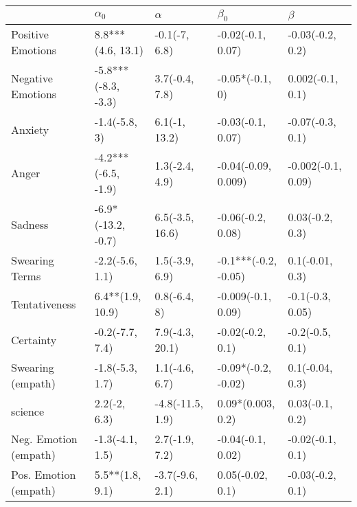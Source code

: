 \begin{tabular}{lllll}
\toprule
{} &           $\alpha_0$ &          $\alpha$ &             $\beta_0$ &             $\beta$ \\
\midrule
Positive Emotions     &    8.8***(4.6, 13.1) &     -0.1(-7, 6.8) &     -0.02(-0.1, 0.07) &    -0.03(-0.2, 0.2) \\
Negative Emotions     &  -5.8***(-8.3, -3.3) &    3.7(-0.4, 7.8) &       -0.05*(-0.1, 0) &    0.002(-0.1, 0.1) \\
Anxiety               &        -1.4(-5.8, 3) &     6.1(-1, 13.2) &     -0.03(-0.1, 0.07) &    -0.07(-0.3, 0.1) \\
Anger                 &  -4.2***(-6.5, -1.9) &    1.3(-2.4, 4.9) &   -0.04(-0.09, 0.009) &  -0.002(-0.1, 0.09) \\
Sadness               &   -6.9*(-13.2, -0.7) &   6.5(-3.5, 16.6) &     -0.06(-0.2, 0.08) &     0.03(-0.2, 0.3) \\
Swearing Terms        &      -2.2(-5.6, 1.1) &    1.5(-3.9, 6.9) &  -0.1***(-0.2, -0.05) &     0.1(-0.01, 0.3) \\
Tentativeness         &     6.4**(1.9, 10.9) &      0.8(-6.4, 8) &    -0.009(-0.1, 0.09) &    -0.1(-0.3, 0.05) \\
Certainty             &      -0.2(-7.7, 7.4) &   7.9(-4.3, 20.1) &      -0.02(-0.2, 0.1) &     -0.2(-0.5, 0.1) \\
Swearing (empath)     &      -1.8(-5.3, 1.7) &    1.1(-4.6, 6.7) &   -0.09*(-0.2, -0.02) &     0.1(-0.04, 0.3) \\
science               &         2.2(-2, 6.3) &  -4.8(-11.5, 1.9) &     0.09*(0.003, 0.2) &     0.03(-0.1, 0.2) \\
Neg. Emotion (empath) &      -1.3(-4.1, 1.5) &    2.7(-1.9, 7.2) &     -0.04(-0.1, 0.02) &    -0.02(-0.1, 0.1) \\
Pos. Emotion (empath) &      5.5**(1.8, 9.1) &   -3.7(-9.6, 2.1) &      0.05(-0.02, 0.1) &    -0.03(-0.2, 0.1) \\
\bottomrule
\end{tabular}
